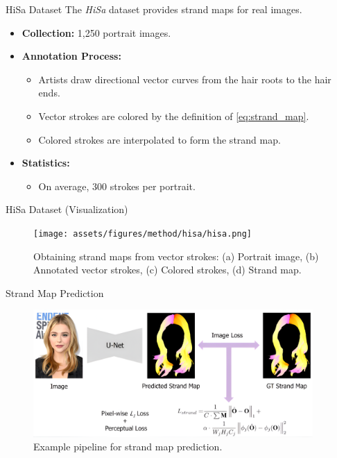 \begin{frame}[t]{HiSa Dataset}
    The \emph{HiSa} dataset provides strand maps for real images.

    \begin{itemize}
        \item \textbf{Collection:} 1,250 portrait images.
        \item \textbf{Annotation Process:}
        \begin{itemize}
            \item Artists draw directional vector curves from the hair roots to the hair ends.
            \item Vector strokes are colored by the definition of \ref{eq:strand_map}.
            \item Colored strokes are interpolated to form the strand map.
        \end{itemize}
        \item \textbf{Statistics:}
        \begin{itemize}
            \item On average, 300 strokes per portrait.
        \end{itemize}
    \end{itemize}
\end{frame}

\begin{frame}{HiSa Dataset (Visualization)}
    \begin{figure}[t]
        \centering
        \texttt{[image: assets/figures/method/hisa/hisa.png]}
        \caption{Obtaining strand maps from vector strokes: 
        (a) Portrait image, (b) Annotated vector strokes, (c) Colored strokes, (d) Strand map.}
        \label{fig:hisa}
    \end{figure}
\end{frame}

\begin{frame}{Strand Map Prediction}
    \begin{figure}[t]
        \centering
        \includegraphics[width=0.95\textwidth]{assets/figures/method/strand/prediction.png}
        \caption{Example pipeline for strand map prediction.}
        \label{fig:strand-map-prediction}
    \end{figure}
\end{frame}

